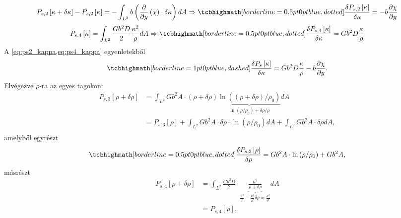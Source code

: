 \documentclass[10pt,a4paper]{scrartcl}
\begin{document}
\begin{equation} \label{eq:ps2_kappa}
{P_{s,2}}\left[ {\kappa  + \delta \kappa } \right] - {P_{s,2}}\left[ \kappa  \right] =  - \int_{{L^2}} {b\left( {\frac{\partial }{{\partial y}}\left( \chi  \right) \cdot \delta \kappa } \right)dA}  \Rightarrow \tcbhighmath[borderline={0.5pt}{0pt}{blue,dotted}]{ \frac{{\delta {P_{s,2}}\left[ \kappa  \right]}}{{\delta \kappa }} =  - b\frac{{\partial \chi }}{{\partial y}}}
\end{equation}
\begin{equation} \label{eq:ps4_kappa}
{P_{s,4}}\left[ \kappa  \right] = \int_{{L^2}} {\frac{{G{b^2}D}}{2}\frac{{{\kappa ^2}}}{\rho }dA}  \Rightarrow \tcbhighmath[borderline={0.5pt}{0pt}{blue,dotted}]{\frac{{\delta {P_{s,4}}\left[ \kappa  \right]}}{{\delta \kappa }} = G{b^2}D\frac{\kappa }{\rho }}
\end{equation}
A \cref{eq:ps2_kappa,eq:ps4_kappa} egyenletekből
\begin{equation} \label{eq:ps_kappa}
\tcbhighmath[borderline={1pt}{0pt}{blue,dashed}]{\frac{{\delta {P_s}\left[ \kappa  \right]}}{{\delta \kappa }} = G{b^2}D\frac{\kappa }{\rho } - b\frac{{\partial \chi }}{{\partial y}}.}
\end{equation}
Elvégezve $\rho$-ra az egyes tagokon:
\[\begin{aligned}
  {P_{s,3}}\left[ {\rho  + \delta \rho } \right] &  = \int_{{L^2}} {G{b^2}A \cdot \left( {\rho  + \delta \rho } \right)\underbrace {\ln \left( {\left( {\rho  + \delta \rho } \right)/{\rho _0}} \right)}_{\ln \left( {\rho /{\rho _0}} \right) + \delta \rho /\rho }} dA \\ 
   &  = {P_{s,3}}\left[ \rho  \right] + \int_{{L^2}} {G{b^2}A \cdot \delta \rho  \cdot \ln \left( {\rho /{\rho _0}} \right)} dA + \int_{{L^2}} {G{b^2}A \cdot \delta \rho } dA, \\ 
\end{aligned} \]
amelyből egyrészt
\begin{equation} \label{eq:ps3_rho}
\tcbhighmath[borderline={0.5pt}{0pt}{blue,dotted}]{\frac{{{\delta P_{s,3}}\left[ \rho  \right]}}{{\delta \rho }} = G{b^2}A \cdot \ln \left( {\rho /{\rho _0}} \right) + G{b^2}A,}
\end{equation}
másrészt
\[\begin{aligned}
  {P_{s,4}}\left[ {\rho  + \delta \rho } \right] &  = \int_{{L^2}} {\frac{{G{b^2}D}}{2} \cdot \underbrace {\frac{{{\kappa ^2}}}{{\rho  + \delta \rho }}}_{\frac{{{\kappa ^2}}}{\rho } - \frac{{{\kappa ^2}}}{{{\rho ^2}}}\delta \rho \approx \frac{\kappa^2}{\rho }}} dA \\ 
   &  = {P_{s,4}}\left[ \rho  \right], \\ 
\end{aligned} \]
\end{document}
